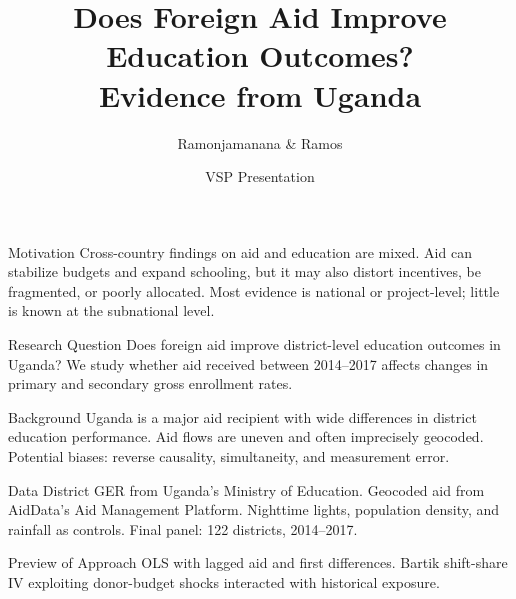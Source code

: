 \documentclass{beamer}
\title{Does Foreign Aid Improve Education Outcomes?\\Evidence from Uganda}
\author{Ramonjamanana \& Ramos}
\date{VSP Presentation}
\begin{document}
\begin{frame}
\titlepage
\end{frame}

\begin{frame}{Motivation}
Cross-country findings on aid and education are mixed.  
Aid can stabilize budgets and expand schooling, but it may also distort incentives, be fragmented, or poorly allocated.  
Most evidence is national or project-level; little is known at the subnational level.
\end{frame}

\begin{frame}{Research Question}
Does foreign aid improve district-level education outcomes in Uganda?  
We study whether aid received between 2014--2017 affects changes in primary and secondary gross enrollment rates.
\end{frame}

\begin{frame}{Background}
Uganda is a major aid recipient with wide differences in district education performance.  
Aid flows are uneven and often imprecisely geocoded.  
Potential biases: reverse causality, simultaneity, and measurement error.
\end{frame}

\begin{frame}{Data}
District GER from Uganda’s Ministry of Education.  
Geocoded aid from AidData’s Aid Management Platform.  
Nighttime lights, population density, and rainfall as controls.  
Final panel: 122 districts, 2014--2017.
\end{frame}

\begin{frame}{Preview of Approach}
OLS with lagged aid and first differences.  
Bartik shift-share IV exploiting donor-budget shocks interacted with historical exposure.
\end{frame}
\end{document}
